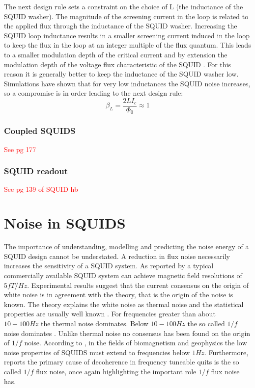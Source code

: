 The next design rule sets a constraint on the choice of L (the inductance of the SQUID washer). The magnitude of the screening current in the loop is related to the applied flux through the inductance of the SQUID washer. Increasing the SQUID loop inductance results in a smaller screening current induced in the loop to keep the flux in the loop at an integer multiple of the flux quantum. This leads to a smaller modulation depth of the critical current and by extension the modulation depth of the voltage flux characteristic of the SQUID \cite{Drung2016NBSQUIDS}. For this reason it is generally better to keep the inductance of the SQUID washer low. Simulations have shown that for very low inductances the SQUID noise increases, so a compromise is in order \cite{Drung2016NBSQUIDS} leading to the next design rule: 
\begin{equation}
    \beta_L = \frac{2LI_c}{\Phi_0} \approx 1
    \label{eq:SQUIDmodDepth}
\end{equation}

\subsubsection*{Coupled SQUIDS}
\textcolor{red}{See pg 177}

\subsubsection*{SQUID readout}
\textcolor{red}{See pg 139 of SQUID hb}
\section{Noise in SQUIDS}
The importance of understanding, modelling and predicting the noise energy of a SQUID design cannot be understated. A reduction in flux noise necessarily increases the sensitivity of a SQUID system. As reported by \cite{LowNoiseGrad} a typical commercially available SQUID system can achieve magnetic field resolutions of $5 \si{fT/Hz}$. Experimental results suggest that the current consensus on the origin of white noise is in agreement with the theory, that is the origin of the noise is known. The theory explains the white noise as thermal noise and the statistical properties are usually well known \cite{Drung2016NBSQUIDS} \cite{SQUIDhandbook}. For frequencies greater than about $10 - 100\si{Hz}$ the thermal noise dominates. Below $10 - 100\si{Hz}$ the so called $1/f$ noise dominates \cite{DCSQUIDdesignImage}. Unlike thermal noise no consensus has been found on the origin of $1/f$ noise. According to \cite{SQUIDhandbook}, in the fields of biomagnetism and geophysics the low noise properties of SQUIDS must extend to frequencies below $1\si{Hz}$. Furthermore, \cite{QubitPerf} reports the primary cause of decoherence in frequency tuneable quits is the so called $1/f$ flux noise, once again highlighting the important role $1/f$ flux noise has.


